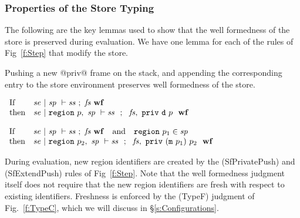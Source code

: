 \subsubsection{Properties of the Store Typing}
The following are the key lemmas used to show that the well formedness of the store is preserved during evaluation. We have one lemma for each of the rules of Fig~\ref{f:Step} that modify the store. 


%

\begin{lemma} Pushing a new @priv@ frame on the stack, and appending the corresponding entry to the store environment preserves well formedness of the store.
\end{lemma}
$
\begin{array}{ll}
   \textrm{If}         & \mathit{se} ~|~ \mathit{sp} ~\vdash \mathit{ss} ~;~ \mathit{fs} ~ {\mathbf{wf}}
\\ \textrm{then}       & \mathit{se} ~|~ \texttt{region}~ p,~ \mathit{sp} ~\vdash \mathit{ss}~ ~;~ ~\mathit{fs},~ \texttt{priv}~ \texttt{d}~ p~ ~ {\mathbf{wf}}
\end{array}
$

\medskip
$
\begin{array}{ll}
   \textrm{If}         & \mathit{se} ~|~ \mathit{sp} ~\vdash \mathit{ss} ~;~ \mathit{fs} ~ {\mathbf{wf}} 
 ~~~ \textrm{and} ~~~      \texttt{region}~ p_1 \in \mathit{sp}
\\ \textrm{then}       & \mathit{se} ~|~ \texttt{region}~ p_2,~ \mathit{sp} ~\vdash \mathit{ss}~ ~;~ ~\mathit{fs},~ \texttt{priv}~ (\texttt{m}~ p_1)~ p_2~ ~ {\mathbf{wf}}
\end{array}
$

\medskip\noindent
During evaluation, new region identifiers are created by the (SfPrivatePush) and (SfExtendPush) rules of Fig~\ref{f:Step}. Note that the well formedness judgment itself does not require that the new region identifiers are fresh with respect to existing identifiers. Freshness is enforced by the (TypeF) judgment of Fig.~\ref{f:TypeC}, which we will discuss in \S\ref{s:Configurations}.
\qqed



